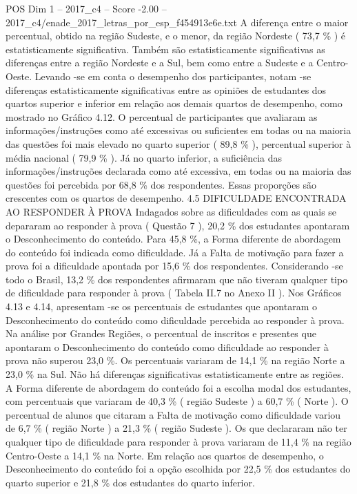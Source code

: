 \begin{textsample}{POS Dim 1 – 2017\_c4 – Score -2.00 – 2017\_c4/enade\_2017\_letras\_por\_esp\_f454913e6e.txt}
A diferença entre o maior percentual, obtido na região Sudeste, e o menor, da região Nordeste ( 73,7 \% ) é estatisticamente significativa.
Também são estatisticamente significativas as diferenças entre a região Nordeste e a Sul, bem como entre a Sudeste e a Centro-Oeste.
Levando -se em conta o desempenho dos participantes, notam -se diferenças estatisticamente significativas entre as opiniões de estudantes dos quartos superior e inferior em relação aos demais quartos de desempenho, como mostrado no Gráfico 4.12.
O percentual de participantes que avaliaram as informações/instruções como até excessivas ou suficientes em todas ou na maioria das questões foi mais elevado no quarto superior ( 89,8 \% ), percentual superior à média nacional ( 79,9 \% ).
Já no quarto inferior, a suficiência das informações/instruções declarada como até excessiva, em todas ou na maioria das questões foi percebida por 68,8 \% dos respondentes.
Essas proporções são crescentes com os quartos de desempenho. 4.5 DIFICULDADE ENCONTRADA AO RESPONDER À PROVA Indagados sobre as dificuldades com as quais se depararam ao responder à prova ( Questão 7 ), 20,2 \% dos estudantes apontaram o Desconhecimento do conteúdo.
Para 45,8 \%, a Forma diferente de abordagem do conteúdo foi indicada como dificuldade.
Já a Falta de motivação para fazer a prova foi a dificuldade apontada por 15,6 \% dos respondentes.
Considerando -se todo o Brasil, 13,2 \% dos respondentes afirmaram que não tiveram qualquer tipo de dificuldade para responder à prova ( Tabela II.7 no Anexo II ).
Nos Gráficos 4.13 e 4.14, apresentam -se os percentuais de estudantes que apontaram o Desconhecimento do conteúdo como dificuldade percebida ao responder à prova.
Na análise por Grandes Regiões, o percentual de inscritos e presentes que apontaram o Desconhecimento do conteúdo como dificuldade ao responder à prova não superou 23,0 \%.
Os percentuais variaram de 14,1 \% na região Norte a 23,0 \% na Sul.
Não há diferenças significativas estatisticamente entre as regiões.
A Forma diferente de abordagem do conteúdo foi a escolha modal dos estudantes, com percentuais que variaram de 40,3 \% ( região Sudeste ) a 60,7 \% ( Norte ).
O percentual de alunos que citaram a Falta de motivação como dificuldade variou de 6,7 \% ( região Norte ) a 21,3 \% ( região Sudeste ).
Os que declararam não ter qualquer tipo de dificuldade para responder à prova variaram de 11,4 \% na região Centro-Oeste a 14,1 \% na Norte.
Em relação aos quartos de desempenho, o Desconhecimento do conteúdo foi a opção escolhida por 22,5 \% dos estudantes do quarto superior e 21,8 \% dos estudantes do quarto inferior.

\end{textsample}
